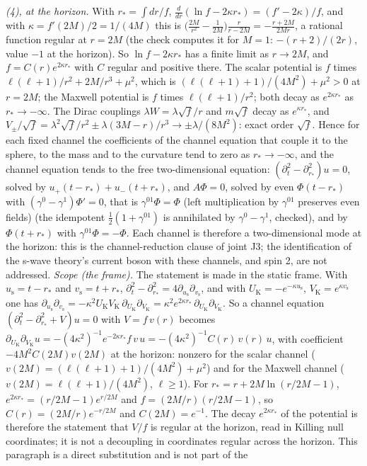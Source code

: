 \emph{(4), at the horizon.} With $r_{*} = \int dr/f$, $\tfrac{d}{dr}(\ln f - 2\kappa r_{*}) = (f' - 2\kappa)/f$, and with $\kappa = f'(2M)/2 = 1/(4M)$ this is $\bigl(\tfrac{2M}{r^{2}} - \tfrac{1}{2M}\bigr)\tfrac{r}{r - 2M} = -\tfrac{r + 2M}{2Mr}$, a rational function regular at $r = 2M$ (the check computes it for $M = 1$: $-(r+2)/(2r)$, value $-1$ at the horizon). So $\ln f - 2\kappa r_{*}$ has a finite limit as $r \to 2M$, and $f = C(r)e^{2\kappa r_{*}}$ with $C$ regular and positive there. The scalar potential is $f$ times $\ell(\ell+1)/r^{2} + 2M/r^{3} + \mu^{2}$, which is $(\ell(\ell+1) + 1)/(4M^{2}) + \mu^{2} > 0$ at $r = 2M$; the Maxwell potential is $f$ times $\ell(\ell+1)/r^{2}$; both decay as $e^{2\kappa r_{*}}$ as $r_{*} \to -\infty$. The Dirac couplings $\lambda W = \lambda\sqrt f/r$ and $m\sqrt f$ decay as $e^{\kappa r_{*}}$, and $V_{\pm}/\sqrt f = \lambda^{2}\sqrt f/r^{2} \pm \lambda(3M - r)/r^{3} \to \pm\lambda/(8M^{2})$: exact order $\sqrt f$. Hence for each fixed channel the coefficients of the channel equation that couple it to the sphere, to the mass and to the curvature tend to zero as $r_{*} \to -\infty$, and the channel equation tends to the free two-dimensional equation: $(\partial_{t}^{2} - \partial_{r_{*}}^{2})u = 0$, solved by $u_{+}(t - r_{*}) + u_{-}(t + r_{*})$, and $A\Phi = 0$, solved by even $\Phi(t - r_{*})$ with $(\gamma^{0} - \gamma^{1})\Phi' = 0$, that is $\gamma^{01}\Phi = \Phi$ (left multiplication by $\gamma^{01}$ preserves even fields) (the idempotent $\tfrac12(1 + \gamma^{01})$ is annihilated by $\gamma^{0} - \gamma^{1}$, checked), and by $\Phi(t + r_{*})$ with $\gamma^{01}\Phi = -\Phi$. Each channel is therefore a two-dimensional mode at the horizon: this is the channel-reduction clause of joint J3; the identification of the s-wave theory's current boson with these channels, and spin 2, are not addressed. \emph{Scope (the frame).} The statement is made in the static frame. With $u_{\mathrm{s}} = t - r_{*}$ and $v_{\mathrm{s}} = t + r_{*}$, $\partial_{t}^{2} - \partial_{r_{*}}^{2} = 4\partial_{u_{\mathrm{s}}}\partial_{v_{\mathrm{s}}}$, and with $U_{\mathrm{K}} = -e^{-\kappa u_{\mathrm{s}}}$, $V_{\mathrm{K}} = e^{\kappa v_{\mathrm{s}}}$ one has $\partial_{u_{\mathrm{s}}}\partial_{v_{\mathrm{s}}} = -\kappa^{2}U_{\mathrm{K}}V_{\mathrm{K}}\,\partial_{U_{\mathrm{K}}}\partial_{V_{\mathrm{K}}} = \kappa^{2}e^{2\kappa r_{*}}\,\partial_{U_{\mathrm{K}}}\partial_{V_{\mathrm{K}}}$. So a channel equation $(\partial_{t}^{2} - \partial_{r_{*}}^{2} + V)u = 0$ with $V = f\,v(r)$ becomes $\partial_{U_{\mathrm{K}}}\partial_{V_{\mathrm{K}}}u = -(4\kappa^{2})^{-1}e^{-2\kappa r_{*}}f\,v\,u = -(4\kappa^{2})^{-1}C(r)\,v(r)\,u$, with coefficient $-4M^{2}C(2M)v(2M)$ at the horizon: nonzero for the scalar channel ($v(2M) = (\ell(\ell+1) + 1)/(4M^{2}) + \mu^{2}$) and for the Maxwell channel ($v(2M) = \ell(\ell+1)/(4M^{2})$, $\ell \geq 1$). For $r_{*} = r + 2M\ln(r/2M - 1)$, $e^{2\kappa r_{*}} = (r/2M - 1)e^{r/2M}$ and $f = (2M/r)(r/2M - 1)$, so $C(r) = (2M/r)e^{-r/2M}$ and $C(2M) = e^{-1}$. The decay $e^{2\kappa r_{*}}$ of the potential is therefore the statement that $V/f$ is regular at the horizon, read in Killing null coordinates; it is not a decoupling in coordinates regular across the horizon. This paragraph is a direct substitution and is not part of the 